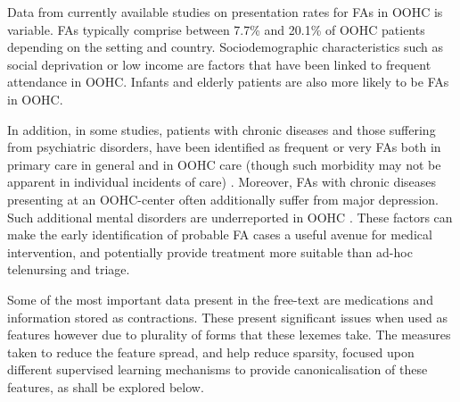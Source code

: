 















Data from currently available studies on presentation rates for FAs in
OOHC is variable. FAs typically comprise between 7.7\% and 20.1\% of OOHC patients depending on
the setting and country.\cite{leutgeb2018patients} Sociodemographic characteristics such as social deprivation or low
income are factors that have been linked to frequent attendance in OOHC. Infants and
elderly patients are also more likely to be FAs in OOHC.


In addition, in some studies, patients
with chronic diseases and those suffering from psychiatric disorders, have been identified as frequent or very FAs both in primary care in general and in OOHC
care (though such morbidity may not be apparent in individual incidents of care) \cite{ng2015frequent}. Moreover, FAs with chronic diseases presenting at an OOHC-center often additionally suffer from major depression. Such additional mental disorders are underreported in
OOHC \cite{bhroin2019profiling}. These factors can make the early identification of probable FA cases a useful avenue for medical intervention, and potentially provide treatment more suitable than ad-hoc telenursing and triage.

Some of the most important data present in the free-text are medications and information stored as contractions. These present significant issues when used as features however due to plurality of forms that these lexemes take. The measures taken to reduce the feature spread, and help reduce sparsity, focused upon different supervised learning mechanisms to provide canonicalisation of these features, as shall be explored below. 
